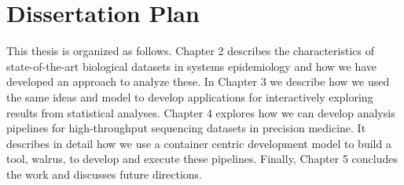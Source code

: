 \section{Dissertation Plan} 
This thesis is organized as follows. Chapter 2 describes the characteristics of
state-of-the-art biological datasets in systems epidemiology and how we have
developed an approach to analyze these. 
In Chapter 3 we describe how we used the same ideas and model to develop
applications for interactively exploring results from statistical analyses.
Chapter 4 explores how we can develop analysis pipelines for high-throughput
sequencing datasets in precision medicine. It describes in detail how we use a
container centric development model to build a tool, walrus, to develop and
execute these pipelines.
Finally, Chapter 5 concludes the work and discusses future directions. 

